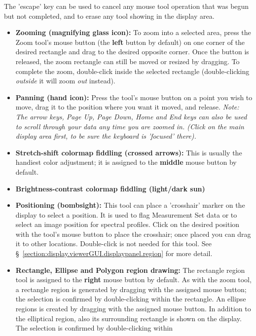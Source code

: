 The 'escape' key can be used to cancel any mouse tool operation that was
begun but not completed, and to erase any tool showing in the display area.
\begin{itemize}
   \item {\bf Zooming (magnifying glass icon):}
     To zoom into a selected area, press the Zoom tool's mouse button
     (the {\bf left} button by default) on one corner of the desired
     rectangle and drag to the desired opposite corner. Once the button is
     released, the zoom rectangle can still be moved or resized by dragging.
     To complete the zoom, double-click inside the selected rectangle
     (double-clicking {\it outside} it will zoom {\it out} instead).
   \item {\bf Panning (hand icon):} Press the tool's mouse button on a 
     point you wish to move, drag it to the position where you want it
     moved, and release. {\it Note: The arrow keys, Page Up, Page Down,
     Home and End keys can also be used to scroll through your data any time
     you are zoomed in. (Click on the main display area first, to be sure
     the keyboard is 'focused' there).}
   \item {\bf Stretch-shift colormap fiddling (crossed arrows):} This is
     usually the handiest color adjustment; it is assigned to the {\bf middle}
     mouse button by default.
   \item {\bf Brightness-contrast colormap fiddling (light/dark sun)} 
   \item {\bf Positioning (bombsight):} This tool can place a 'crosshair'
     marker on the display to select a position. It is used to flag
     Measurement Set data or to select an image position for spectral profiles.
     Click on the desired position with the tool's mouse button to place
     the crosshair; once placed you can drag it to other locations.
     Double-click is not needed for this tool.  
     See \S~\ref{section:display.viewerGUI.displaypanel.region} for more
     detail.
   \item {\bf Rectangle, Ellipse and Polygon region drawing:} The rectangle
     region tool is assigned to the {\bf right} mouse button by default.
     As with the zoom tool, a rectangle region is generated by dragging with
     the assigned mouse button; the selection is confirmed by double-clicking
     within the rectangle.
     An ellipse regions is created by dragging with the assigned mouse button.
     In addition to the elliptical region, also its surrounding rectangle is
     shown on the display. The selection is confirmed by double-clicking within

\end{itemize}

